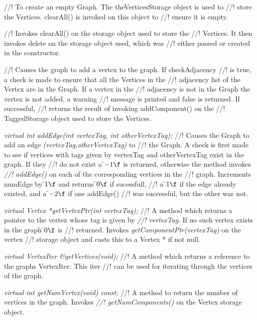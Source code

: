 //! To create an empty Graph. The \p theVerticesStorage object is used to
//! store the Vertices. clearAll() is invoked on this object to
//! ensure it is empty.

//! Invokes clearAll() on the storage object used to store the
//! Vertices. It then invokes delete on the storage object used, which was
//! either passed or created in the constructor.

//! Causes the graph to add a vertex to the graph. If \p checkAdjacency
//! is \p true, a check is made to ensure that all the Vertices in the
//! adjacency list of the Vertex are in the Graph. If a vertex in the
//! adjacency is not in the Graph the vertex is not added, a warning
//! message is printed and \p false is returned. If successful,
//! returns the result of invoking addComponent() on the
//! TaggedStorage object used to store the Vertices.



{\em virtual int addEdge(int vertexTag, int otherVertexTag); }
//! Causes the Graph to add an edge {\em (vertexTag,otherVertexTag)} to
//! the Graph. A check is first made to see if vertices with tags given by
\p vertexTag and \p otherVertexTag exist in the graph. If they
//! do not exist a \f$-1\f$ is returned, otherwise the method invokes {\em
//! addEdge()} on each of the corresponding vertices in the 
//! graph. Increments \p numEdge by \f$1\f$ and returns \f$0\f$ if sucessfull,
//! a \f$1\f$ if the edge already existed, and a \f$-2\f$ if one addEdge()
//! was successful, but the other was not.  

{\em virtual Vertex *getVertexPtr(int vertexTag);}
//! A method which returns a pointer to the vertex whose tag is given by {\em
//! vertexTag}. If no such vertex exists in the graph \f$0\f$ is
//! returned. Invokes {\em getComponentPtr(vertexTag)} on the vertex
//! storage object and casts this to a Vertex * if not null.

{\em virtual VertexIter \&getVertices(void);}
//! A method which returns a reference to the graphs VertexIter. This iter
//! can be used for iterating through the vertices of the graph.

{\em virtual int getNumVertex(void) const;}
//! A method to return the number of vertices in the graph. Invokes {\em
//! getNumComponents()} on the Vertex storage object.


